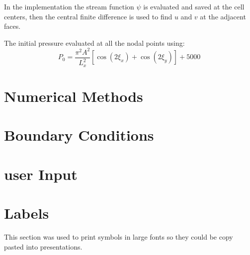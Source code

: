 \documentclass{article}
\begin{document}
In the implementation the stream function $\psi$ is evaluated and saved at the cell centers, then the central finite difference is used to find $u$ and $v$ at the adjacent faces.


The initial pressure evaluated at all the nodal points using:
$$ P_0 =  \frac{\pi^2 A^2}{L_x^2} \left[ \cos(2 \xi_x) + \cos(2 \xi_y) \right] + 5000 $$ 




\section{Numerical Methods}

\section{Boundary Conditions}

\section{user Input}



\section{Labels}
This section was used to print symbols in large fonts so they could be copy pasted into presentations.
\end{document}
